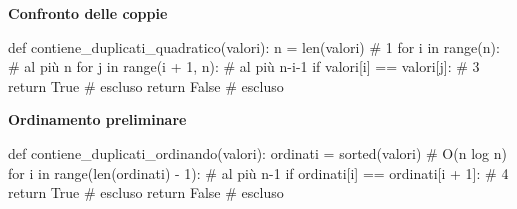 \noindent\hspace*{2mm}%
\begin{minipage}[t]{\dimexpr\linewidth/2-4mm\relax}
\vspace{0pt}
\textbf{Confronto delle coppie}
\begin{unipdcode}[language=Python,
  basicstyle=\ttfamily\scriptsize,
  numbers=none,
  xleftmargin=0pt,
  xrightmargin=0pt,
  framexleftmargin=0.3em]
def contiene_duplicati_quadratico(valori):
    n = len(valori)                       # 1
    for i in range(n):                    # al più n
        for j in range(i + 1, n):         # al più n-i-1
            if valori[i] == valori[j]:    # 3
                return True               # escluso
    return False                          # escluso
\end{unipdcode}
\end{minipage}%
\hspace*{4mm}%
\begin{minipage}[t]{\dimexpr\linewidth/2-4mm\relax}
\vspace{0pt}
\textbf{Ordinamento preliminare}
\begin{unipdcode}[language=Python,
  basicstyle=\ttfamily\scriptsize,
  numbers=none,
  xleftmargin=0pt,
  xrightmargin=0pt,
  framexleftmargin=0.3em]
def contiene_duplicati_ordinando(valori):
    ordinati = sorted(valori)               # O(n log n)
    for i in range(len(ordinati) - 1):      # al più n-1
        if ordinati[i] == ordinati[i + 1]:  # 4
            return True                     # escluso
    return False                            # escluso
\end{unipdcode}
\end{minipage}
